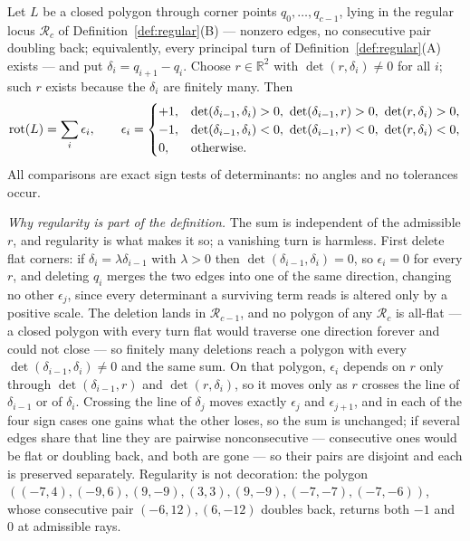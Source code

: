 \begin{definition}\label{def:rot}
Let $L$ be a closed polygon through corner points $q_0,\dots,q_{c-1}$, lying
in the regular locus $\mathcal R_c$ of Definition~\ref{def:regular}(B) ---
nonzero edges, no consecutive pair doubling back; equivalently, every
principal turn of Definition~\ref{def:regular}(A) exists --- and put
$\delta_i=q_{i+1}-q_i$. Choose $r\in\mathbb{R}^2$ with $\det(r,\delta_i)\neq0$
for all $i$; such $r$ exists because the $\delta_i$ are finitely many. Then
\[
   \rot(L)=\sum_{i}\epsilon_i,\qquad
   \epsilon_i=\begin{cases}
     +1,&\det(\delta_{i-1},\delta_i)>0,\ \det(\delta_{i-1},r)>0,\ \det(r,\delta_i)>0,\\
     -1,&\det(\delta_{i-1},\delta_i)<0,\ \det(\delta_{i-1},r)<0,\ \det(r,\delta_i)<0,\\
     0,&\text{otherwise.}
   \end{cases}
\]
All comparisons are exact sign tests of determinants: no angles and no
tolerances occur.

\emph{Why regularity is part of the definition.} The sum is independent of
the admissible $r$, and regularity is what makes it so; a vanishing turn is
harmless. First delete flat corners: if $\delta_i=\lambda\delta_{i-1}$ with
$\lambda>0$ then $\det(\delta_{i-1},\delta_i)=0$, so $\epsilon_i=0$ for every
$r$, and deleting $q_i$ merges the two edges into one of the same direction,
changing no other $\epsilon_j$, since every determinant a surviving term
reads is altered only by a positive scale. The deletion lands in
$\mathcal R_{c-1}$, and no polygon of any $\mathcal R_c$ is all-flat --- a
closed polygon with every turn flat would traverse one direction forever and
could not close --- so finitely many deletions reach a polygon with every
$\det(\delta_{i-1},\delta_i)\neq0$ and the same sum. On that polygon,
$\epsilon_i$ depends on $r$ only through $\det(\delta_{i-1},r)$ and
$\det(r,\delta_i)$, so it moves only as $r$ crosses the line of
$\delta_{i-1}$ or of $\delta_i$. Crossing the line of $\delta_j$ moves
exactly $\epsilon_j$ and $\epsilon_{j+1}$, and in each of the four sign cases
one gains what the other loses, so the sum is unchanged; if several edges
share that line they are pairwise nonconsecutive --- consecutive ones would
be flat or doubling back, and both are gone --- so their pairs are disjoint
and each is preserved separately. Regularity is not decoration: the polygon
$((-7,4),(-9,6),(9,-9),(3,3),(9,-9),(-7,-7),(-7,-6))$, whose consecutive
pair $(-6,12),(6,-12)$ doubles back, returns both $-1$ and $0$ at admissible
rays.


\end{definition}
